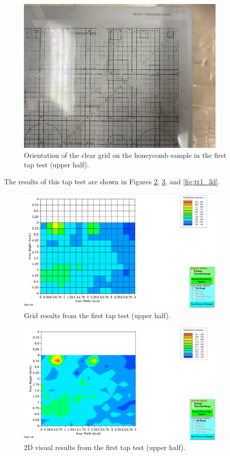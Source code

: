 \documentclass[12 pt]{report}
\begin{document}
\begin{figure}[htbp]
	\centering
	\includegraphics[width=4in]{images/graphs/tap testing/S4G2tap1-orientation}
	\caption{Orientation of the clear grid on the honeycomb sample in the first tap test (upper half).}
	\label{fig:tt1_orientation}
\end{figure}

The results of this tap test are shown in Figures \ref{fig:tt1_grid}, \ref{fig:tt1_2d}, and \ref{fig:tt1_3d}.

\begin{figure}[htbp]
	\centering
	\includegraphics[width=4in]{images/graphs/tap testing/S4G2tap1-grid}
	\caption{Grid results from the first tap test (upper half).}
	\label{fig:tt1_grid}
\end{figure}

\begin{figure}[htbp]
	\centering
	\includegraphics[width=4in]{images/graphs/tap testing/S4G2tap1-2D}
	\caption{2D visual results from the first tap test (upper half).}
	\label{fig:tt1_2d}
\end{figure}
\end{document}
